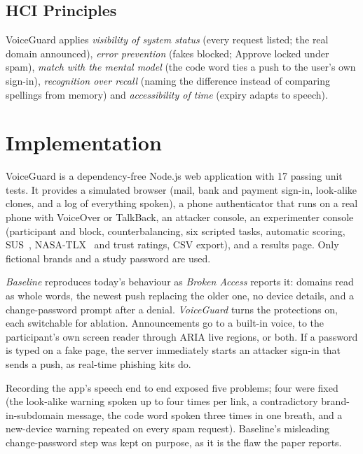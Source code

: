 \documentclass[conference]{IEEEtran}
\begin{document}
\subsection{HCI Principles}

VoiceGuard applies \emph{visibility of system status} (every request listed; the real domain announced), \emph{error prevention} (fakes blocked; Approve locked under spam), \emph{match with the mental model} (the code word ties a push to the user's own sign-in), \emph{recognition over recall} (naming the difference instead of comparing spellings from memory) and \emph{accessibility of time} (expiry adapts to speech).

\section{Implementation}

VoiceGuard is a dependency-free Node.js web application with 17 passing unit tests. It provides a simulated browser (mail, bank and payment sign-in, look-alike clones, and a log of everything spoken), a phone authenticator that runs on a real phone with VoiceOver or TalkBack, an attacker console, an experimenter console (participant and block, counterbalancing, six scripted tasks, automatic scoring, SUS~\cite{sus}, NASA-TLX~\cite{tlx} and trust ratings, CSV export), and a results page. Only fictional brands and a study password are used.

\emph{Baseline} reproduces today's behaviour as \emph{Broken Access} reports it: domains read as whole words, the newest push replacing the older one, no device details, and a change-password prompt after a denial. \emph{VoiceGuard} turns the protections on, each switchable for ablation. Announcements go to a built-in voice, to the participant's own screen reader through ARIA live regions, or both. If a password is typed on a fake page, the server immediately starts an attacker sign-in that sends a push, as real-time phishing kits do.

Recording the app's speech end to end exposed five problems; four were fixed (the look-alike warning spoken up to four times per link, a contradictory brand-in-subdomain message, the code word spoken three times in one breath, and a new-device warning repeated on every spam request). Baseline's misleading change-password step was kept on purpose, as it is the flaw the paper reports.

\end{document}
